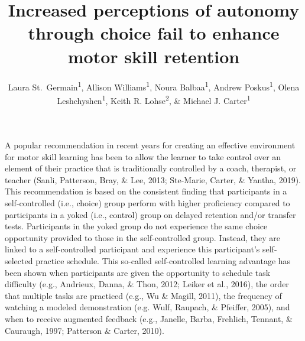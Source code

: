 \documentclass[
  english,
  man, donotrepeattitle,floatsintext]{apa7}
\title{Increased perceptions of autonomy through choice fail to enhance motor skill retention}
\author{Laura St.~Germain\textsuperscript{1}, Allison Williams\textsuperscript{1}, Noura Balbaa\textsuperscript{1}, Andrew Poskus\textsuperscript{1}, Olena Leshchyshen\textsuperscript{1}, Keith R. Lohse\textsuperscript{2}, \& Michael J. Carter\textsuperscript{1}}
\date{}
\affiliation{\vspace{0.5cm}\textsuperscript{1} Department of Kinesiology, McMaster University\\\textsuperscript{2} Program in Physical Therapy, Washington University School of Medicine in Saint Louis}
\begin{document}
\maketitle

A popular recommendation in recent years for creating an effective environment for motor skill learning has been to allow the learner to take control over an element of their practice that is traditionally controlled by a coach, therapist, or teacher (Sanli, Patterson, Bray, \& Lee, 2013; Ste-Marie, Carter, \& Yantha, 2019). This recommendation is based on the consistent finding that participants in a self-controlled (i.e., choice) group perform with higher proficiency compared to participants in a yoked (i.e., control) group on delayed retention and/or transfer tests. Participants in the yoked group do not experience the same choice opportunity provided to those in the self-controlled group. Instead, they are linked to a self-controlled participant and experience this participant's self-selected practice schedule. This so-called self-controlled learning advantage has been shown when participants are given the opportunity to schedule task difficulty (e.g., Andrieux, Danna, \& Thon, 2012; Leiker et al., 2016), the order that multiple tasks are practiced (e.g., Wu \& Magill, 2011), the frequency of watching a modeled demonstration (e.g. Wulf, Raupach, \& Pfeiffer, 2005), and when to receive augmented feedback (e.g., Janelle, Barba, Frehlich, Tennant, \& Cauraugh, 1997; Patterson \& Carter, 2010).
\end{document}
